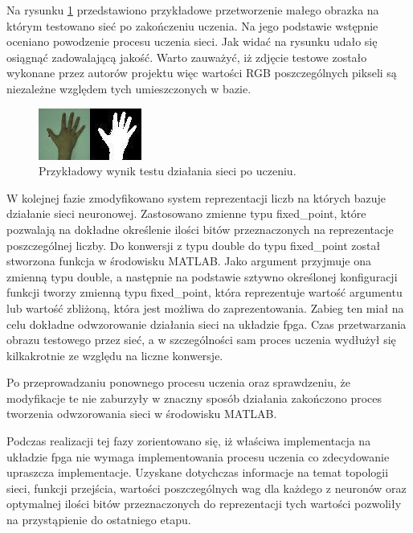 Na rysunku \ref{fig:reka} przedstawiono przykładowe przetworzenie małego obrazka na którym testowano sieć po zakończeniu uczenia. Na jego podstawie wstępnie oceniano powodzenie procesu uczenia sieci. Jak widać na rysunku udało się osiągnąć zadowalającą jakość. Warto zauważyć, iż zdjęcie testowe zostało wykonane przez autorów projektu więc wartości RGB poszczególnych pikseli są niezależne względem tych umieszczonych w bazie.

\begin{figure}[tbph!]
	\centering
	\includegraphics[width=0.6\linewidth]{images/reka.png}
	\caption{Przykładowy wynik testu działania sieci po uczeniu.}
	\label{fig:reka}
\end{figure}

W kolejnej fazie zmodyfikowano system reprezentacji liczb na których bazuje działanie sieci neuronowej. Zastosowano zmienne typu fixed\_point, które pozwalają na dokładne określenie ilości bitów przeznaczonych na reprezentacje poszczególnej liczby. Do konwersji z typu double do typu fixed\_point został stworzona funkcja w środowisku MATLAB. Jako argument przyjmuje ona zmienną typu double, a następnie na podstawie sztywno określonej konfiguracji funkcji tworzy zmienną typu fixed\_point, która reprezentuje wartość argumentu lub wartość zbliżoną, która jest możliwa do zaprezentowania. Zabieg ten miał na celu dokładne odwzorowanie działania sieci na układzie fpga. Czas przetwarzania obrazu testowego przez sieć, a w szczególności sam proces uczenia wydłużył się kilkakrotnie ze względu na liczne konwersje.

Po przeprowadzaniu ponownego procesu uczenia oraz sprawdzeniu, że modyfikacje te nie zaburzyły w znaczny sposób działania zakończono proces tworzenia odwzorowania sieci w środowisku MATLAB. 

Podczas realizacji tej fazy zorientowano się, iż właściwa implementacja na układzie fpga nie wymaga implementowania procesu uczenia co zdecydowanie upraszcza implementacje. Uzyskane dotychczas informacje na temat topologii sieci, funkcji przejścia, wartości poszczególnych wag dla każdego z neuronów oraz optymalnej ilości bitów przeznaczonych do reprezentacji tych wartości pozwoliły na przystąpienie do ostatniego etapu.

